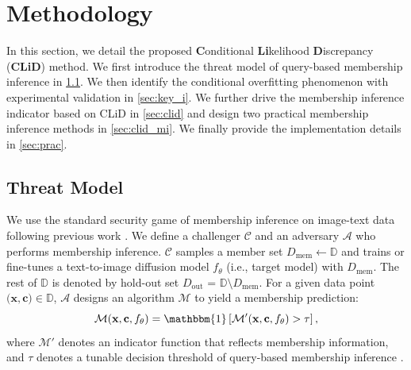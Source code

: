 
\section{Methodology} 

In this section, we detail the proposed \textbf{C}onditional \textbf{Li}kelihood \textbf{D}iscrepancy (\textbf{CLiD}) method. We first introduce the threat model of query-based membership inference in \cref{sec:threat_m}. We then identify the conditional overfitting phenomenon with experimental validation in \cref{sec:key_i}. We further drive the membership inference indicator based on CLiD in \cref{sec:clid} and design two practical membership inference methods in \cref{sec:clid_mi}.
We finally provide the implementation details in \cref{sec:prac}.

\vspace{-2pt}
\subsection{Threat Model}\label{sec:threat_m}
\vspace{-2pt}

We use the standard security game of membership inference on image-text data following previous work \cite{sablayrolles2019white, carlini2022membership, carlini2023extracting, matsumoto2023membership}.
We define a challenger $\mathcal{C}$  and an adversary $\mathcal{A}$ who performs membership inference. $\mathcal{C}$ samples a member set $D_{\text{mem}} \leftarrow \mathbb{D}$ and trains or fine-tunes a text-to-image diffusion model $f_{\theta}$ (i.e., target model) with $D_{\text{mem}}$. The rest of $\mathbb{D}$ is denoted by hold-out set $D_{\text{out}}$ =  $\mathbb{D} \setminus D_{\text{mem}}$. 
For a given data point ${(\mathbf{x}, \mathbf{c}}) \in \mathbb{D} $, $\mathcal{A}$ designs an algorithm $\mathcal{M}$ to yield a membership prediction:
\begin{equation}  %
\mathcal{M}(\mathbf{x},\mathbf{c},f_{\theta}) = \mathbbm{1} \left[
\mathcal{M'}(\mathbf{x},\mathbf{c},f_{\theta})
> \tau  \right],
\end{equation}
where $\mathcal{M'}$ denotes an indicator function that reflects membership information, and $\tau $ denotes a tunable decision threshold of query-based membership inference \cite{matsumoto2023membership,duan2023diffusion, kong2023efficient,fu2023probabilistic}.


